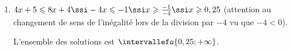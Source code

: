 %
%
%
%
\begin{exr}
    \begin{enumerate}[label=\textbf{\alph*.},start=3]
    \item $4x+5\leqslant8x+4 \ssi -4x \leqslant -1 \ssi x \geqslant \frac{-1}{-4} \ssi x \geqslant 0,25$ (attention au changement de sens de l'inégalité lors de la division par $-4$ vu que $-4<0$).

    L'ensemble des solutions est $\intervallefo{0,25;+\infty}$.
    \end{enumerate}
\end{exr}
%
%
%
